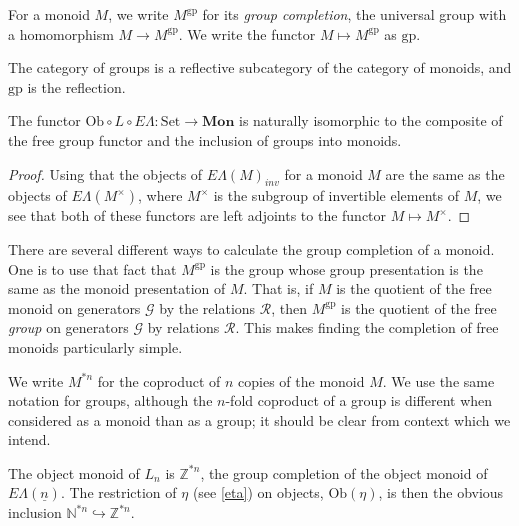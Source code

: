 \documentclass{amsbook} %
\newcommand{\mb}{\mathbf}
\newcommand{\Set}{\ensuremath{\textrm{Set}}}
\newcommand{\EL}{E\Lambda}
\newcommand{\ELn}{E\Lambda(\underline{n})}
\newcommand{\ob}{\textrm{Ob}}
\newcommand{\sets}{\Set}
\newcommand{\mon}{\ensuremath{\mb{Mon}}}
\numberwithin{section}{chapter}
\begin{document}
\begin{Defi} For a monoid $M$, we write $M^{\mathrm{gp}}$ for its \emph{group completion}, the universal group with a homomorphism $M \to M^{\mathrm{gp}}$.  We write the functor $M \mapsto M^{\mathrm{gp}}$ as $\mathrm{gp}$.
\end{Defi}

\begin{rem}
The category of groups is a reflective subcategory of the category of monoids, and $\mathrm{gp}$ is the reflection.
\end{rem}

\begin{prop}\label{oblel_fg}
The functor $\ob \circ L \circ \EL: \sets \to \mon$ is naturally isomorphic to the composite of the free group functor and the inclusion of groups into monoids.
\end{prop}
\begin{proof}
Using that the objects of $\EL(M)_{inv}$ for a monoid $M$ are the same as the objects of $\EL(M^{\times})$, where $M^{\times}$ is the subgroup of invertible elements of $M$, we see that both of these functors are left adjoints to the functor $M \mapsto M^{\times}$.
\end{proof}
There are several different ways to calculate the group completion of a monoid. One is to use that fact that $M^{\mathrm{gp}}$ is the group whose group presentation is the same as the monoid presentation of $M$. That is, if $M$ is the quotient of the free monoid on generators $\mathcal{G}$ by the relations $\mathcal{R}$, then $M^{\mathrm{gp}}$ is the quotient of the free \emph{group} on generators $\mathcal{G}$ by relations $\mathcal{R}$. This makes finding the completion of free monoids particularly simple.

\begin{nota}
We write $M^{*n}$ for the coproduct of $n$ copies of the monoid $M$. We use the same notation for groups, although the $n$-fold coproduct of a group is different when considered as a monoid than as a group; it should be clear from context which we intend.
\end{nota}

\begin{cor}\label{Zobj}
The object monoid of $L_n$ is $\mathbb{Z}^{*n}$, the group completion of the object monoid of $\ELn$. The restriction of $\eta$ (see \cref{eta}) on objects, $\mathrm{Ob}(\eta)$, is then the obvious inclusion $\mathbb{N}^{*n} \hookrightarrow \mathbb{Z}^{*n}$.
\end{cor}
\end{document}
